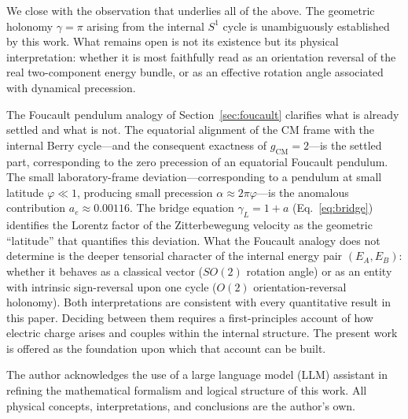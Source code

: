 \documentclass[%
 reprint,
 amsmath,amssymb,
 aps,
 prb,
]{revtex4-2}
\numberwithin{equation}{section}
\theoremstyle{definition}
\theoremstyle{remark}
\newcommand{\Sone}{S^1}
\begin{document}
We close with the observation that underlies all of the above. The geometric holonomy $\gamma = \pi$ arising from the internal $\Sone$ cycle is unambiguously established by this work. What remains open is not its existence but its physical interpretation: whether it is most faithfully read as an orientation reversal of the real two-component energy bundle, or as an effective rotation angle associated with dynamical precession.

The Foucault pendulum analogy of Section~\ref{sec:foucault} clarifies what is already settled and what is not. The equatorial alignment of the CM frame with the internal Berry cycle---and the consequent exactness of $g_{\text{CM}} = 2$---is the settled part, corresponding to the zero precession of an equatorial Foucault pendulum. The small laboratory-frame deviation---corresponding to a pendulum at small latitude $\varphi \ll 1$, producing small precession $\alpha \approx 2\pi\varphi$---is the anomalous contribution $a_e \approx 0.00116$. The bridge equation $\gamma_L = 1 + a$ (Eq.~\ref{eq:bridge}) identifies the Lorentz factor of the Zitterbewegung velocity as the geometric ``latitude'' that quantifies this deviation. What the Foucault analogy does not determine is the deeper tensorial character of the internal energy pair $(E_A, E_B)$: whether it behaves as a classical vector ($SO(2)$ rotation angle) or as an entity with intrinsic sign-reversal upon one cycle ($O(2)$ orientation-reversal holonomy). Both interpretations are consistent with every quantitative result in this paper. Deciding between them requires a first-principles account of how electric charge arises and couples within the internal structure. The present work is offered as the foundation upon which that account can be built.

\begin{acknowledgments}
The author acknowledges the use of a large language model (LLM) assistant in refining the mathematical formalism and logical structure of this work. All physical concepts, interpretations, and conclusions are the author's own.
\end{acknowledgments}
\end{document}
